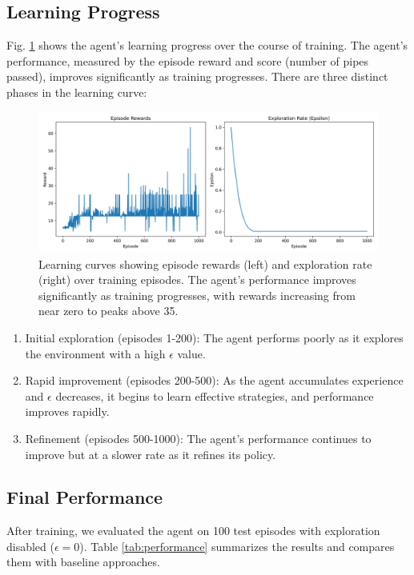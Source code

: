 \documentclass[conference]{IEEEtran}
\begin{document}
\subsection{Learning Progress}
Fig. \ref{fig:learning_curve} shows the agent's learning progress over the course of training. The agent's performance, measured by the episode reward and score (number of pipes passed), improves significantly as training progresses. There are three distinct phases in the learning curve:

\begin{figure}[!t]
\centering
\includegraphics[width=\columnwidth]{figures/training_results.png}
\caption{Learning curves showing episode rewards (left) and exploration rate (right) over training episodes. The agent's performance improves significantly as training progresses, with rewards increasing from near zero to peaks above 35.}
\label{fig:learning_curve}
\end{figure}

\begin{enumerate}
    \item Initial exploration (episodes 1-200): The agent performs poorly as it explores the environment with a high $\epsilon$ value.
    \item Rapid improvement (episodes 200-500): As the agent accumulates experience and $\epsilon$ decreases, it begins to learn effective strategies, and performance improves rapidly.
    \item Refinement (episodes 500-1000): The agent's performance continues to improve but at a slower rate as it refines its policy.
\end{enumerate}

\subsection{Final Performance}
After training, we evaluated the agent on 100 test episodes with exploration disabled ($\epsilon = 0$). Table \ref{tab:performance} summarizes the results and compares them with baseline approaches.
\end{document}
